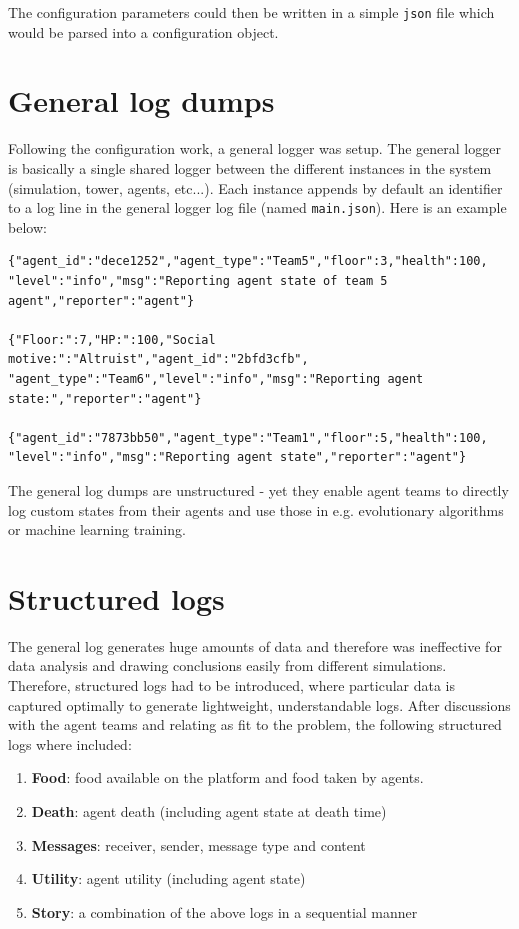 The configuration parameters could then be written in a simple \texttt{json} file which would be parsed into a configuration object.

\section{General log dumps}

Following the configuration work, a general logger was setup. The general logger is basically a single shared logger between the different instances in the system (simulation, tower, agents, etc...). Each instance appends by default an identifier to a log line in the general logger log file (named \texttt{main.json}). Here is an example below:

\begin{verbatim}
{"agent_id":"dece1252","agent_type":"Team5","floor":3,"health":100,
"level":"info","msg":"Reporting agent state of team 5 agent","reporter":"agent"}

{"Floor:":7,"HP:":100,"Social motive:":"Altruist","agent_id":"2bfd3cfb",
"agent_type":"Team6","level":"info","msg":"Reporting agent state:","reporter":"agent"}

{"agent_id":"7873bb50","agent_type":"Team1","floor":5,"health":100,
"level":"info","msg":"Reporting agent state","reporter":"agent"}
\end{verbatim}

The general log dumps are unstructured - yet they enable agent teams to directly log custom states from their agents and use those in e.g. evolutionary algorithms or machine learning training.

\section{Structured logs}

The general log generates huge amounts of data and therefore was ineffective for data analysis and drawing conclusions easily from different simulations. Therefore, structured logs had to be introduced, where particular data is captured optimally to generate lightweight, understandable logs. After discussions with the agent teams and relating as fit to the problem, the following structured logs where included:

\begin{enumerate}
    \item \textbf{Food}: food available on the platform and food taken by agents.
    \item \textbf{Death}: agent death (including agent state at death time)
    \item \textbf{Messages}: receiver, sender, message type and content
    \item \textbf{Utility}: agent utility (including agent state)
    \item \textbf{Story}: a combination of the above logs in a sequential manner
\end{enumerate}

